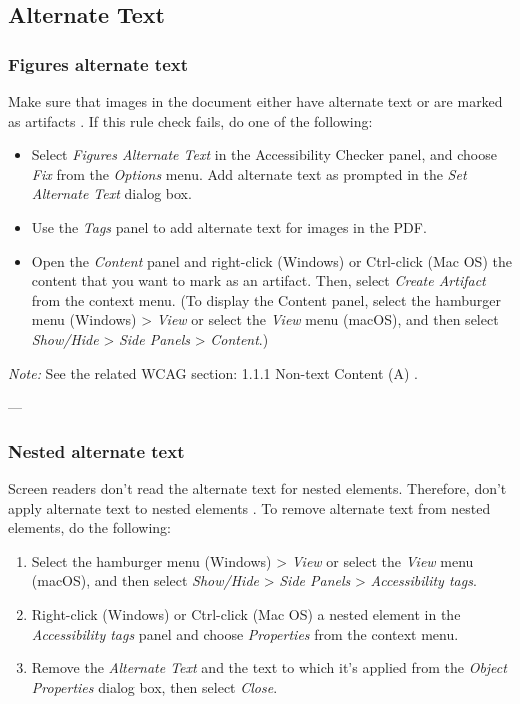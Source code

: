 \subsection{Alternate Text}
\label{subsec:acrobat-alt-text}
\subsubsection{Figures alternate text}
\label{subsubsec:acrobat-figures-alt-text}
Make sure that images in the document either have alternate text or are marked as artifacts \cite{AdobeHelpX}.
If this rule check fails, do one of the following:
\begin{itemize}
    \item Select \emph{Figures Alternate Text} in the Accessibility Checker panel, and choose \emph{Fix} from the \emph{Options} menu. Add alternate text as prompted in the \emph{Set Alternate Text} dialog box.
    \item Use the \emph{Tags} panel to add alternate text for images in the PDF.
    \item Open the \emph{Content} panel and right-click (Windows) or Ctrl-click (Mac OS) the content that you want to mark as an artifact. Then, select \emph{Create Artifact} from the context menu. (To display the Content panel, select the hamburger menu (Windows) > \emph{View} or select the \emph{View} menu (macOS), and then select \emph{Show/Hide} > \emph{Side Panels} > \emph{Content}.)
\end{itemize}

\vspace{0.5em}
\noindent\textit{Note:} See the related WCAG section: 1.1.1 Non-text Content (A) \cite{WCAG}.

---

\subsubsection{Nested alternate text}
\label{subsubsec:acrobat-nested-alt-text}
Screen readers don't read the alternate text for nested elements. Therefore, don't apply alternate text to nested elements \cite{AdobeHelpX}.
To remove alternate text from nested elements, do the following:
\begin{enumerate}
    \item Select the hamburger menu (Windows) > \emph{View} or select the \emph{View} menu (macOS), and then select \emph{Show/Hide} > \emph{Side Panels} > \emph{Accessibility tags}.
    \item Right-click (Windows) or Ctrl-click (Mac OS) a nested element in the \emph{Accessibility tags} panel and choose \emph{Properties} from the context menu.
    \item Remove the \emph{Alternate Text} and the text to which it's applied from the \emph{Object Properties} dialog box, then select \emph{Close}.
\end{enumerate}

